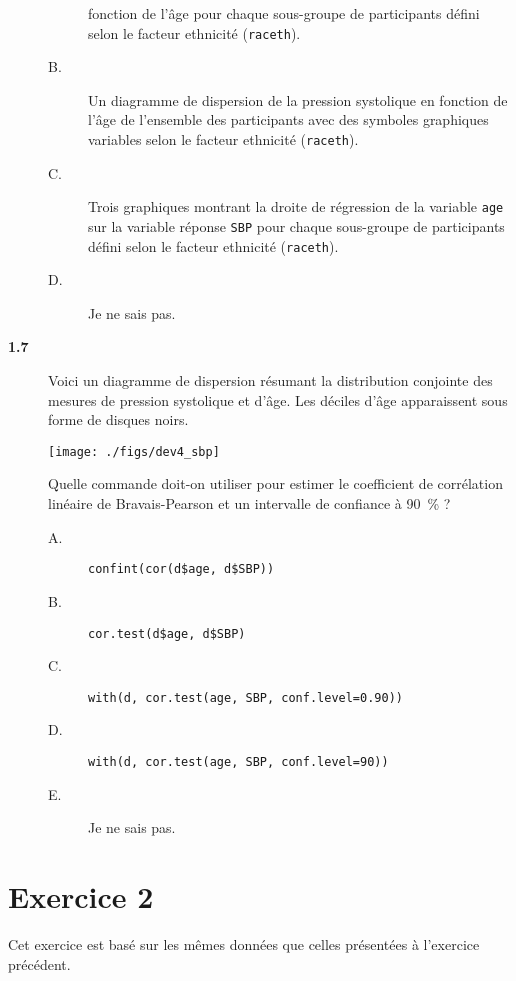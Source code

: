 \documentclass[11pt]{report}
\theoremstyle{definition}
\begin{document}
\begin{description}
\begin{description}
    fonction de l'âge pour chaque sous-groupe de participants défini selon
    le facteur ethnicité (\texttt{raceth}).
  \item[B.] Un diagramme de dispersion de la pression systolique en
    fonction de l'âge de l'ensemble des participants avec des symboles
    graphiques variables selon le facteur ethnicité (\texttt{raceth}).
  \item[C.] Trois graphiques montrant la droite de régression de la
    variable \texttt{age} sur la variable réponse \texttt{SBP} pour
    chaque sous-groupe de participants défini selon le facteur ethnicité
    (\texttt{raceth}).
  \item[D.] Je ne sais pas.
  \end{description}  
\item[\bf 1.7]  Voici un diagramme de dispersion
  résumant la distribution conjointe des mesures de pression systolique et
  d'âge. Les déciles d'âge apparaissent sous forme de disques noirs.
\begin{center}
\texttt{[image: ./figs/dev4\_sbp]}  
\end{center}
Quelle commande doit-on utiliser pour estimer le coefficient de corrélation
linéaire de Bravais-Pearson et un intervalle de confiance à 90~\% ?

\begin{description}
\item[A.] \verb|confint(cor(d$age, d$SBP))|
\item[B.] \verb|cor.test(d$age, d$SBP)|
\item[C.] \verb|with(d, cor.test(age, SBP, conf.level=0.90))|
\item[D.] \verb|with(d, cor.test(age, SBP, conf.level=90))|
\item[E.] Je ne sais pas.
\end{description}  
\end{description}

\section*{Exercice 2}
Cet exercice est basé sur les mêmes données que celles présentées à
l'exercice précédent.
\end{document}
